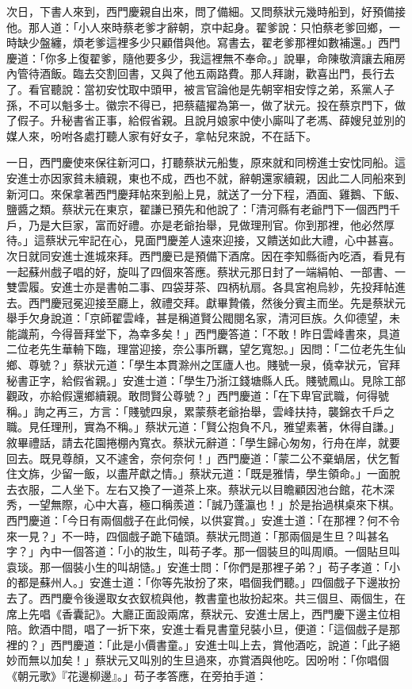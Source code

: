 次日，下書人來到，西門慶親自出來，問了備細。又問蔡狀元幾時船到，好預備接他。那人道：「小人來時蔡老爹才辭朝，京中起身。翟爹說：只怕蔡老爹回鄉，一時缺少盤纏，煩老爹這裡多少只顧借與他。寫書去，翟老爹那裡如數補還。」西門慶道：「你多上復翟爹，隨他要多少，我這裡無不奉命。」說畢，命陳敬濟讓去廂房內管待酒飯。臨去交割回書，又與了他五兩路費。那人拜謝，歡喜出門，長行去了。看官聽說：當初安忱取中頭甲，被言官論他是先朝宰相安惇之弟，系黨人子孫，不可以魁多士。徽宗不得已，把蔡蘊擢為第一，做了狀元。投在蔡京門下，做了假子。升秘書省正事，給假省親。且說月娘家中使小廝叫了老馮、薛嫂兒並別的媒人來，吩咐各處打聽人家有好女子，拿帖兒來說，不在話下。

一日，西門慶使來保往新河口，打聽蔡狀元船隻，原來就和同榜進士安忱同船。這安進士亦因家貧未續親，東也不成，西也不就，辭朝還家續親，因此二人同船來到新河口。來保拿著西門慶拜帖來到船上見，就送了一分下程，酒面、雞鵝、下飯、鹽醬之類。蔡狀元在東京，翟謙已預先和他說了：「清河縣有老爺門下一個西門千戶，乃是大巨家，富而好禮。亦是老爺抬舉，見做理刑官。你到那裡，他必然厚待。」這蔡狀元牢記在心，見面門慶差人遠來迎接，又饋送如此大禮，心中甚喜。次日就同安進士進城來拜。西門慶已是預備下酒席。因在李知縣衙內吃酒，看見有一起蘇州戲子唱的好，旋叫了四個來答應。蔡狀元那日封了一端絹帕、一部書、一雙雲履。安進士亦是書帕二事、四袋芽茶、四柄杭扇。各具宮袍烏紗，先投拜帖進去。西門慶冠冕迎接至廳上，敘禮交拜。獻畢贄儀，然後分賓主而坐。先是蔡狀元舉手欠身說道：「京師翟雲峰，甚是稱道賢公閥閱名家，清河巨族。久仰德望，未能識荊，今得晉拜堂下，為幸多矣！」西門慶答道：「不敢！昨日雲峰書來，具道二位老先生華輈下臨，理當迎接，奈公事所羈，望乞寬恕。」因問：「二位老先生仙鄉、尊號？」蔡狀元道：「學生本貫滁州之匡廬人也。賤號一泉，僥幸狀元，官拜秘書正字，給假省親。」安進士道：「學生乃浙江錢塘縣人氏。賤號鳳山。見除工部觀政，亦給假還鄉續親。敢問賢公尊號？」西門慶道：「在下卑官武職，何得號稱。」詢之再三，方言：「賤號四泉，累蒙蔡老爺抬舉，雲峰扶持，襲錦衣千戶之職。見任理刑，實為不稱。」蔡狀元道：「賢公抱負不凡，雅望素著，休得自謙。」敘畢禮話，請去花園捲棚內寬衣。蔡狀元辭道：「學生歸心匆匆，行舟在岸，就要回去。既見尊顏，又不遽舍，奈何奈何！」西門慶道：「蒙二公不棄蝸居，伏乞暫住文旆，少留一飯，以盡芹獻之情。」蔡狀元道：「既是雅情，學生領命。」一面脫去衣服，二人坐下。左右又換了一道茶上來。蔡狀元以目瞻顧因池台館，花木深秀，一望無際，心中大喜，極口稱羨道：「誠乃蓬瀛也！」於是抬過棋桌來下棋。西門慶道：「今日有兩個戲子在此伺候，以供宴賞。」安進士道：「在那裡？何不令來一見？」不一時，四個戲子跪下磕頭。蔡狀元問道：「那兩個是生旦？叫甚名字？」內中一個答道：「小的妝生，叫苟子孝。那一個裝旦的叫周順。一個貼旦叫袁琰。那一個裝小生的叫胡慥。」安進士問：「你們是那裡子弟？」苟子孝道：「小的都是蘇州人。」安進士道：「你等先妝扮了來，唱個我們聽。」四個戲子下邊妝扮去了。西門慶令後邊取女衣釵梳與他，教書童也妝扮起來。共三個旦、兩個生，在席上先唱《香囊記》。大廳正面設兩席，蔡狀元、安進士居上，西門慶下邊主位相陪。飲酒中間，唱了一折下來，安進士看見書童兒裝小旦，便道：「這個戲子是那裡的？」西門慶道：「此是小價書童。」安進士叫上去，賞他酒吃，說道：「此子絕妙而無以加矣！」蔡狀元又叫別的生旦過來，亦賞酒與他吃。因吩咐：「你唱個《朝元歌》『花邊柳邊』。」苟子孝答應，在旁拍手道：


